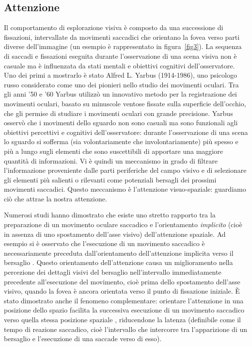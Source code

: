 \documentclass[12pt]{article}
\begin{document}
\subsection{Attenzione}
Il comportamento di esplorazione visiva è composto da una successione di fissazioni, intervallate da movimenti saccadici che orientano la fovea verso parti diverse dell'immagine (un esempio è rappresentato in figura~\ref{fig3}). La sequenza di saccadi e fissazioni eseguita durante l'osservazione di una scena visiva non è casuale ma è influenzata da stati mentali e obiettivi cognitivi dell'osservatore. Uno dei primi a mostrarlo è stato Alfred L. Yarbus (1914-1986), uno psicologo russo considerato come uno dei pionieri nello studio dei movimenti oculari. Tra gli anni '50 e '60 Yarbus utilizzò un innovativo metodo per la registrazione dei movimenti oculari, basato su minuscole ventose fissate sulla superficie dell'occhio, che gli permise di studiare i movimenti oculari con grande precisione. Yarbus osservò che i movimenti dello sguardo non sono casuali ma sono funzionali agli obiettivi percettivi e cognitivi dell'osservatore: durante l'osservazione di una scena lo sguardo si sofferma (sia volontariamente che involontariamente) più spesso e più a lungo  sugli elementi che sono suscettibili di apportare una maggiore quantità di informazioni. Vi è quindi un meccanismo in grado di filtrare l'informazione proveniente dalle parti periferiche del campo visivo e di selezionare gli elementi più salienti o rilevanti come potenziali bersagli dei prossimi movimenti saccadici. Questo meccanismo è l'attenzione visuo-spaziale: guardiamo ciò che attrae la nostra attenzione. 

Numerosi studi hanno dimostrato che esiste uno stretto rapporto tra la preparazione di un movimento oculare saccadico e l'orientamento \textit{implicito} (cioè in assenza di uno spostamento dell'asse visivo) dell'attenzione spaziale. Ad esempio si è osservato che l'esecuzione di un movimento saccadico è necessariamente preceduta dall'orientamento dell'attenzione implicita verso il bersaglio \cite{Deubel1996}. Questo orientamento dell'attenzione causa un miglioramento nella percezione dei dettagli visivi del bersaglio nell'intervallo immediatamente precedente all'esecuzione del movimento, cioè prima dello spostamento dell'asse visivo, quando la fovea è ancora orientata verso il punto di fissazione iniziale. È stato dimostrato anche il fenomeno complementare: orientare l'attenzione in una posizione dello spazio facilita la successiva esecuzione di un movimento saccadico verso quella stessa posizione spaziale \cite{Kowler1995}, riducendone la latenza (definibile come il tempo di reazione saccadico, cioè l'intervallo che intercorre tra l'apparizione di un bersaglio e l'esecuzione di una saccade verso di esso). 
\end{document}
